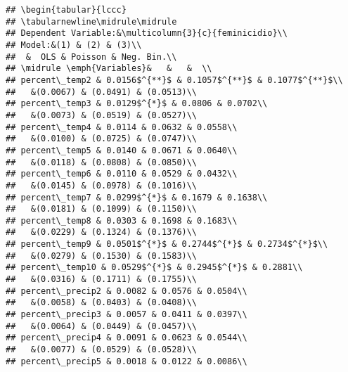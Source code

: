 \documentclass[
]{article}
\begin{document}
\begin{verbatim}
## \begin{tabular}{lccc}
## \tabularnewline\midrule\midrule
## Dependent Variable:&\multicolumn{3}{c}{feminicidio}\\
## Model:&(1) & (2) & (3)\\
##  &  OLS & Poisson & Neg. Bin.\\
## \midrule \emph{Variables}&   &   &  \\
## percent\_temp2 & 0.0156$^{**}$ & 0.1057$^{**}$ & 0.1077$^{**}$\\
##   &(0.0067) & (0.0491) & (0.0513)\\
## percent\_temp3 & 0.0129$^{*}$ & 0.0806 & 0.0702\\
##   &(0.0073) & (0.0519) & (0.0527)\\
## percent\_temp4 & 0.0114 & 0.0632 & 0.0558\\
##   &(0.0100) & (0.0725) & (0.0747)\\
## percent\_temp5 & 0.0140 & 0.0671 & 0.0640\\
##   &(0.0118) & (0.0808) & (0.0850)\\
## percent\_temp6 & 0.0110 & 0.0529 & 0.0432\\
##   &(0.0145) & (0.0978) & (0.1016)\\
## percent\_temp7 & 0.0299$^{*}$ & 0.1679 & 0.1638\\
##   &(0.0181) & (0.1099) & (0.1150)\\
## percent\_temp8 & 0.0303 & 0.1698 & 0.1683\\
##   &(0.0229) & (0.1324) & (0.1376)\\
## percent\_temp9 & 0.0501$^{*}$ & 0.2744$^{*}$ & 0.2734$^{*}$\\
##   &(0.0279) & (0.1530) & (0.1583)\\
## percent\_temp10 & 0.0529$^{*}$ & 0.2945$^{*}$ & 0.2881\\
##   &(0.0316) & (0.1711) & (0.1755)\\
## percent\_precip2 & 0.0082 & 0.0576 & 0.0504\\
##   &(0.0058) & (0.0403) & (0.0408)\\
## percent\_precip3 & 0.0057 & 0.0411 & 0.0397\\
##   &(0.0064) & (0.0449) & (0.0457)\\
## percent\_precip4 & 0.0091 & 0.0623 & 0.0544\\
##   &(0.0077) & (0.0529) & (0.0528)\\
## percent\_precip5 & 0.0018 & 0.0122 & 0.0086\\

\end{verbatim}
\end{document}
